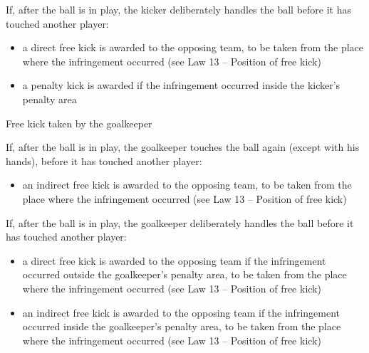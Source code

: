 {\bigskip

If, after the ball is in play, the kicker deliberately handles the ball before it has touched another player:

\begin{itemize}
\item a direct free kick is awarded to the opposing team, to be taken from the place where the infringement occurred (see Law 13 -- Position of free kick)
\item a penalty kick is awarded if the infringement occurred inside the kicker's penalty area
\end{itemize}

\bigskip

Free kick taken by the goalkeeper

If, after the ball is in play, the goalkeeper touches the ball again (except with his hands), before it has touched another player:

\begin{itemize}
\item an indirect free kick is awarded to the opposing team, to be taken from the place where the infringement occurred (see Law 13 -- Position of free kick)
\end{itemize}

\bigskip

If, after the ball is in play, the goalkeeper deliberately handles the ball before it has touched another player:

\begin{itemize}
\item a direct free kick is awarded to the opposing team if the infringement occurred outside the goalkeeper's penalty area, to be taken from the place where the infringement occurred (see Law 13 -- Position of free kick)
\item an indirect free kick is awarded to the opposing team if the infringement occurred inside the goalkeeper's penalty area, to be taken from the place where the infringement occurred (see Law 13 -- Position of free kick)
\end{itemize}
}